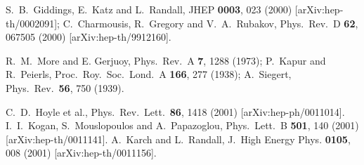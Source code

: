 \documentclass[a4paper,prl,twocolumn,amsmath,amssymb,showpacs]{revtex4}
\begin{document}
\begin{thebibliography}{99}
S.~B.~Giddings, E.~Katz and L.~Randall, 
JHEP {\bf 0003}, 023 (2000) 
[arXiv:hep-th/0002091]; 
C.~Charmousis, R.~Gregory and V.~A.~Rubakov, 
Phys.\ Rev.\ D {\bf 62}, 067505 (2000) 
[arXiv:hep-th/9912160]. 
 
R.~M.~More and E. Gerjuoy, Phys.\ Rev.\ A {\bf 7}, 1288 (1973); 
P.~Kapur and R.~Peierls, Proc.\ Roy.\ Soc.\ Lond.\ A {\bf 166}, 277 (1938); 
A.~Siegert, Phys.\ Rev.\ {\bf 56}, 750 (1939). 
 
C.~D.~Hoyle et al.,  
Phys.\ Rev.\ Lett.\  {\bf 86}, 1418 (2001) 
[arXiv:hep-ph/0011014]. 
I.~I.~Kogan, S.~Mouslopoulos and A.~Papazoglou, 
Phys.\ Lett.\ B {\bf 501}, 140 (2001) [arXiv:hep-th/0011141].
 A.~Karch and L.~Randall, J.\ High Energy Phys. {\bf 0105}, 008 
(2001) [arXiv:hep-th/0011156].
\end{thebibliography} 
\end{document}
